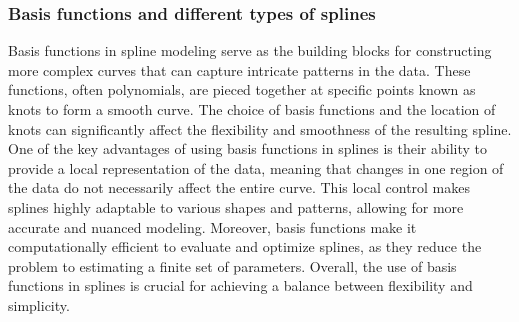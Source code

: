\documentclass[12pt, twoside,hidelinks]{article}
\theoremstyle{definition}
\numberwithin{equation}{section}
\begin{document}
\subsubsection{Basis functions and different types of splines}

Basis functions in spline modeling serve as the building blocks for constructing more complex curves that can capture intricate patterns in the data. These functions, often polynomials, are pieced together at specific points known as knots to form a smooth curve. The choice of basis functions and the location of knots can significantly affect the flexibility and smoothness of the resulting spline. 
One of the key advantages of using basis functions in splines is their ability to provide a local representation of the data, meaning that changes in one region of the data do not necessarily affect the entire curve. This local control makes splines highly adaptable to various shapes and patterns, allowing for more accurate and nuanced modeling. Moreover, basis functions make it computationally efficient to evaluate and optimize splines, as they reduce the problem to estimating a finite set of parameters. Overall, the use of basis functions in splines is crucial for achieving a balance between flexibility and simplicity.
\newline
\end{document}
